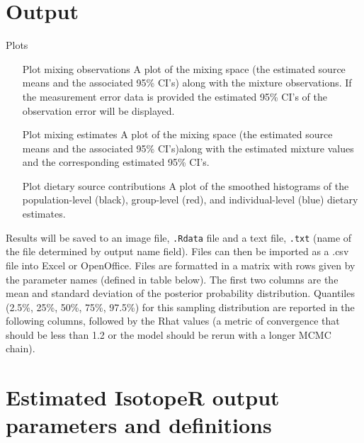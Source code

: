 \documentclass{article}
\newcommand{\code}[1]{{\tt #1}}
\begin{document}
\section*{Output}
Plots
\begin{itemize}
	\item[Plot mixing observations] A plot of the mixing space (the estimated source means and the associated 95\% CI's) along with the mixture observations. If the measurement error data is provided the estimated 95\% CI's of the observation error will be displayed.
	\item[Plot mixing estimates] A plot of the mixing space (the estimated source means and the associated 95\% CI's)along with the estimated mixture values and the corresponding estimated 95\% CI's.
	\item[Plot dietary source contributions] A plot of the smoothed histograms of the population-level (black), group-level (red), and individual-level (blue) dietary estimates.
\end{itemize}

Results will be saved to an image file, \code{.Rdata} file and a text file, \code{.txt} (name of the file determined by output name field). Files can then be imported as a .csv file into Excel or OpenOffice. Files are formatted in a matrix with rows given by the parameter names (defined in table below). The first two columns are the mean and standard deviation of the posterior probability distribution. Quantiles (2.5\%, 25\%, 50\%, 75\%, 97.5\%) for this sampling distribution are reported in the following columns, followed by the Rhat values (a metric of convergence that should be less than 1.2 or the model should be rerun with a longer MCMC chain).


\section*{Estimated IsotopeR output parameters and definitions}
\end{document}
